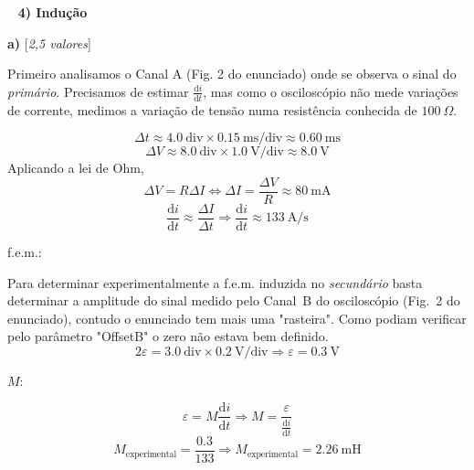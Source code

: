 \documentclass[11pt,a4paper,final]{article}
\begin{document}
~\linebreak
\noindent\textbf{4) Indu\c{c}\~{a}o} %

\textbf{a)} \hfill [\textit{2,5 valores}]

Primeiro analisamos o Canal A (Fig. 2 do enunciado) onde se observa o sinal do \emph{prim\'{a}rio}. Precisamos de estimar $\frac{\mathrm d i}{\mathrm d t}$, mas como o oscilosc\'{o}pio n\~{a}o mede varia\c{c}\~{o}es de corrente, medimos a varia\c{c}\~{a}o de tens\~{a}o numa resist\^{e}ncia conhecida de $100~\Omega$.

\begin{equation*}
\Delta t \approx 4.0~\text{div}\times 0.15~\text{ms/div} \approx 0.60~\text{ms}
\end{equation*}
\begin{equation*}
\Delta V \approx 8.0~\text{div}\times 1.0~\text{V/div} \approx 8.0~\text{V}
\end{equation*}
Aplicando a lei de Ohm,
\begin{equation*}
\Delta V =R\Delta I\Leftrightarrow \Delta I = \frac{\Delta V}{R}\approx 80~\text{mA}
\end{equation*}
\begin{equation*}
\frac{\mathrm d i}{\mathrm d t}\approx\frac{\Delta I}{\Delta t}\Rightarrow\boxed{\frac{\mathrm d i}{\mathrm d t}\approx133~\text{A/s}}
\end{equation*}

\noindent f.e.m.:

Para determinar experimentalmente a f.e.m. induzida no \emph{secund\'{a}rio} basta determinar a amplitude do sinal medido pelo Canal~B do oscilosc\'{o}pio (Fig.~2 do enunciado), contudo o enunciado tem mais uma "rasteira". Como podiam verificar pelo par\^{a}metro "OffsetB" o zero n\~{a}o estava bem definido.
\begin{equation*}
2\varepsilon=3.0~\text{div} \times 0.2~\text{V/div}
\Rightarrow
\boxed{\varepsilon=0.3~\text{V}}
\end{equation*}

\noindent $M$:

\begin{equation*}
\varepsilon=M\frac{\mathrm d i}{\mathrm d t} \Rightarrow M=\frac{\varepsilon}{\frac{\mathrm d i}{\mathrm d t}}
\end{equation*}
\begin{equation*}
M_\text{experimental}=\frac{0.3}{133}\Rightarrow\boxed{M_\text{experimental}=2.26~\text{mH}}
\end{equation*}
\end{document}
